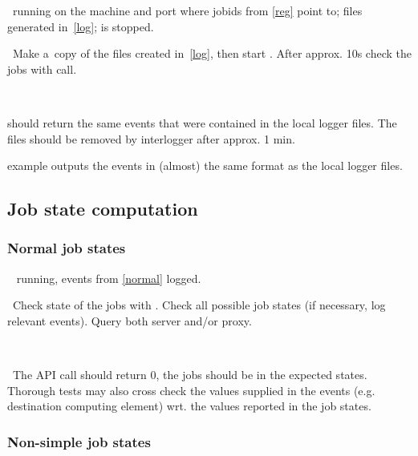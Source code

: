 \req\ running  on the machine and port where
jobids from \ref{reg} point to; files generated in~\ref{log};
 is stopped.

\what\ Make a~copy of the files created in~\ref{log}, then start
. After approx. 10s check the jobs
with  call.

\how\ 

\result {} should return the same events that were
contained in the local logger files. The files should be removed by
interlogger after approx. 1 min.

\begin{hints}
 example outputs the events in (almost) the same
format as the local logger files.
\end{hints}




\subsection{Job state computation}

\subsubsection{Normal job states}
\label{state}

\req\  running, events from \ref{normal} logged.

\what\ Check state of the jobs with . Check all possible job states 
(if necessary, log relevant events). Query both server and/or proxy.

\how\ 

\result\ The API call should return 0, the jobs should be in the expected
states. Thorough tests may also cross check the values supplied in the
events (e.g. destination computing element) wrt. the values reported in the job states.




\subsubsection{Non-simple job states}



